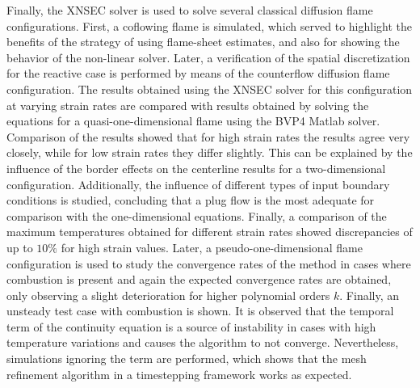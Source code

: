 Finally, the XNSEC solver is used to solve several classical diffusion flame configurations. First, a coflowing flame is simulated, which served to highlight the benefits of the strategy of using flame-sheet estimates, and also for showing the behavior of the non-linear solver. Later, a verification of the spatial discretization for the reactive case is performed by means of the counterflow diffusion flame configuration. The results obtained using the XNSEC solver for this configuration at varying strain rates are compared with results obtained by solving the equations for a quasi-one-dimensional flame using the BVP4 Matlab solver. Comparison of the results showed that for high strain rates the results agree very closely, while for low strain rates they differ slightly. This can be explained by the influence of the border effects on the centerline results for a two-dimensional configuration. Additionally, the influence of different types of input boundary conditions is studied, concluding that a plug flow is the most adequate for comparison with the one-dimensional equations. Finally, a comparison of the maximum temperatures obtained for different strain rates showed discrepancies of up to $10\%$ for high strain values. Later, a pseudo-one-dimensional flame configuration is used to study the convergence rates of the method in cases where combustion is present and again the expected convergence rates are obtained, only observing a slight deterioration for higher polynomial orders $k$. Finally, an unsteady test case with combustion is shown. It is observed that the temporal term of the continuity equation is a source of instability in cases with high temperature variations and causes the algorithm to not converge. Nevertheless, simulations ignoring the term are performed, which shows that the mesh refinement algorithm in a timestepping framework works as expected.
\FloatBarrier